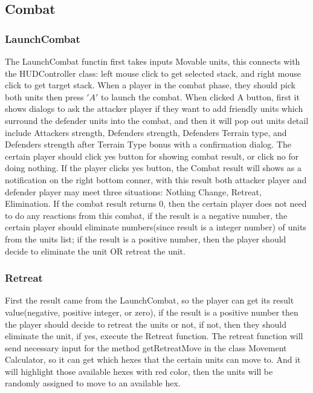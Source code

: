 \documentclass[12pt,a4paper]{article}
\begin{document}
\subsection{Combat}
\subsubsection{LaunchCombat}
The LaunchCombat functin first takes inputs Movable units, this connects with the HUDController class: left mouse click to get selected stack, and right mouse click to get target stack. When a player in the combat phase, they should pick both units then press $'A'$ to launch the combat. When clicked A button, first it shows dialogs to ask the attacker player if they want to add friendly units which surround the defender units into the combat, and then it will pop out units detail include Attackers strength, Defenders strength, Defenders Terrain type, and Defenders strength after Terrain Type bonus with a confirmation dialog. The certain player should click yes button for showing combat result, or click no for doing nothing. If the player clicks yes button, the Combat result will shows as a notification on the right bottom conner, with this result both attacker player and defender player may meet three situations: Nothing Change, Retreat, Elimination. If the combat result returns 0, then the certain player does not need to do any reactions from this combat, if the result is a negative number, the certain player should eliminate numbers(since result is a integer number) of units from the units list; if the result is a positive number, then the player should decide to eliminate the unit OR retreat the unit.\\

\subsubsection{Retreat}
First the result came from the LaunchCombat, so the player can get its result value(negative, positive integer, or zero), if the result is a positive number then the player should decide to retreat the units or not, if not, then they should eliminate the unit, if yes, execute the Retreat function. The retreat function will send necessary input for the method getRetreatMove in the class Movement Calculator, so it can get which hexes that the certain units can move to. And it will highlight those available hexes with red color, then the units will be randomly assigned to move to an available hex.
\end{document}
